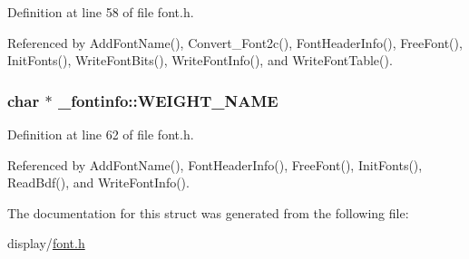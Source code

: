 Definition at line 58 of file font.\-h.



Referenced by Add\-Font\-Name(), Convert\-\_\-\-Font2c(), Font\-Header\-Info(), Free\-Font(), Init\-Fonts(), Write\-Font\-Bits(), Write\-Font\-Info(), and Write\-Font\-Table().

\hypertarget{struct__fontinfo_a2f528cb5c1bceb6afd91ad138472d071}{
\subsubsection[{W\-E\-I\-G\-H\-T\-\_\-\-N\-A\-M\-E}]{\setlength{\rightskip}{0pt plus 5cm}char $\ast$ \-\_\-fontinfo\-::\-W\-E\-I\-G\-H\-T\-\_\-\-N\-A\-M\-E}}\label{struct__fontinfo_a2f528cb5c1bceb6afd91ad138472d071}


Definition at line 62 of file font.\-h.



Referenced by Add\-Font\-Name(), Font\-Header\-Info(), Free\-Font(), Init\-Fonts(), Read\-Bdf(), and Write\-Font\-Info().



The documentation for this struct was generated from the following file\-:\begin{DoxyCompactItemize}
\item 
display/\hyperlink{display_2font_8h}{font.\-h}\end{DoxyCompactItemize}
